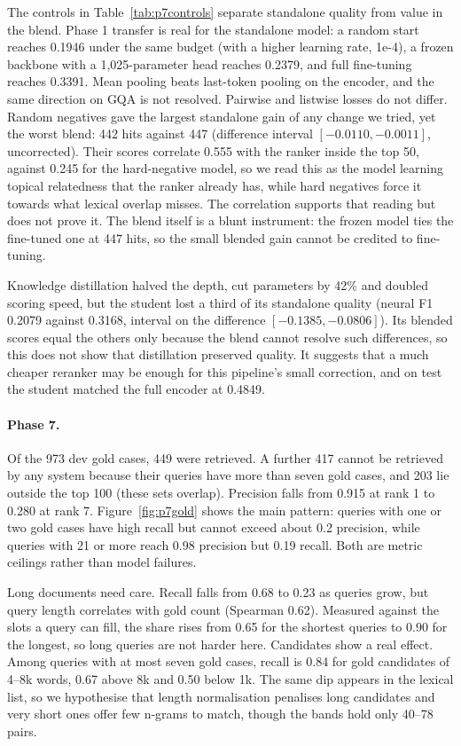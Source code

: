 The controls in Table~\ref{tab:p7controls} separate standalone quality from value in the blend. Phase 1 transfer is real for the standalone model: a random start reaches 0.1946 under the same budget (with a higher learning rate, 1e-4), a frozen backbone with a 1,025-parameter head reaches 0.2379, and full fine-tuning reaches 0.3391. Mean pooling beats last-token pooling on the encoder, and the same direction on GQA is not resolved. Pairwise and listwise losses do not differ. Random negatives gave the largest standalone gain of any change we tried, yet the worst blend: 442 hits against 447 (difference interval $[-0.0110, -0.0011]$, uncorrected). Their scores correlate 0.555 with the ranker inside the top 50, against 0.245 for the hard-negative model, so we read this as the model learning topical relatedness that the ranker already has, while hard negatives force it towards what lexical overlap misses. The correlation supports that reading but does not prove it. The blend itself is a blunt instrument: the frozen model ties the fine-tuned one at 447 hits, so the small blended gain cannot be credited to fine-tuning.

Knowledge distillation \cite{hinton2015distilling} halved the depth, cut parameters by 42\% and doubled scoring speed, but the student lost a third of its standalone quality (neural F1 0.2079 against 0.3168, interval on the difference $[-0.1385, -0.0806]$). Its blended scores equal the others only because the blend cannot resolve such differences, so this does not show that distillation preserved quality. It suggests that a much cheaper reranker may be enough for this pipeline's small correction, and on test the student matched the full encoder at 0.4849.

\paragraph{Phase 7.} Of the 973 dev gold cases, 449 were retrieved. A further 417 cannot be retrieved by any system because their queries have more than seven gold cases, and 203 lie outside the top 100 (these sets overlap). Precision falls from 0.915 at rank 1 to 0.280 at rank 7. Figure~\ref{fig:p7gold} shows the main pattern: queries with one or two gold cases have high recall but cannot exceed about 0.2 precision, while queries with 21 or more reach 0.98 precision but 0.19 recall. Both are metric ceilings rather than model failures.

Long documents need care. Recall falls from 0.68 to 0.23 as queries grow, but query length correlates with gold count (Spearman 0.62). Measured against the slots a query can fill, the share rises from 0.65 for the shortest queries to 0.90 for the longest, so long queries are not harder here. Candidates show a real effect. Among queries with at most seven gold cases, recall is 0.84 for gold candidates of 4--8k words, 0.67 above 8k and 0.50 below 1k. The same dip appears in the lexical list, so we hypothesise that length normalisation penalises long candidates and very short ones offer few n-grams to match, though the bands hold only 40--78 pairs.

